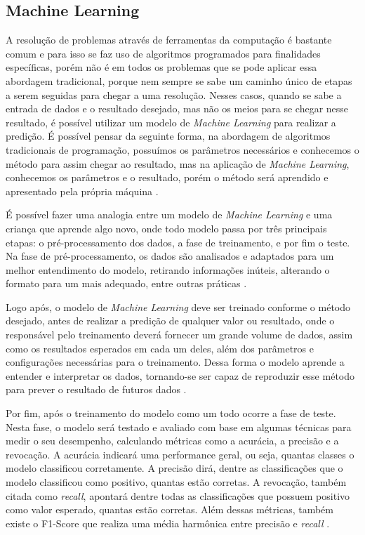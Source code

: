 \subsection{Machine Learning}

A resolução de problemas através de ferramentas da computação é bastante comum e para isso se faz uso de algoritmos programados para finalidades específicas, porém não é em todos os problemas que se pode aplicar essa abordagem tradicional, porque nem sempre se sabe um caminho único de etapas a serem seguidas para chegar a uma resolução. Nesses casos, quando se sabe a entrada de dados e o resultado desejado, mas não os meios para se chegar nesse resultado, é possível utilizar um modelo de \emph{Machine Learning} para realizar a predição. É possível pensar da seguinte forma, na abordagem de algoritmos tradicionais de programação, possuímos os parâmetros necessários e conhecemos o método para assim chegar ao resultado, mas na aplicação de \emph{Machine Learning}, conhecemos os parâmetros e o resultado, porém o método será aprendido e apresentado pela própria máquina \cite{machineLearning}.

É possível fazer uma analogia entre um modelo de \emph{Machine Learning} e uma criança que aprende algo novo, onde todo modelo passa por três principais etapas: o pré-processamento dos dados, a fase de treinamento, e por fim o teste. Na fase de pré-processamento, os dados são analisados e adaptados para um melhor entendimento do modelo, retirando informações inúteis, alterando o formato para um mais adequado, entre outras práticas \cite{machineLearningPython}.

Logo após, o modelo de \emph{Machine Learning} deve ser treinado conforme o método desejado, antes de realizar a predição de qualquer valor ou resultado, onde o responsável pelo treinamento deverá fornecer um grande volume de dados, assim como os resultados esperados em cada um deles, além dos parâmetros e configurações necessárias para o treinamento. Dessa forma o modelo aprende a entender e interpretar os dados, tornando-se ser capaz de reproduzir esse método para prever o resultado de futuros dados \cite{machineLearningPython}.

Por fim, após o treinamento do modelo como um todo ocorre a fase de teste. Nesta fase, o modelo será testado e avaliado com base em algumas técnicas para medir o seu desempenho, calculando métricas como a acurácia, a precisão e a revocação. A acurácia indicará uma performance geral, ou seja, quantas classes o modelo classificou corretamente. A precisão dirá, dentre as classificações que o modelo classificou como positivo, quantas estão corretas. A revocação, também citada como \emph{recall}, apontará dentre todas as classificações que possuem positivo como valor esperado, quantas estão corretas. Além dessas métricas, também existe o F1-Score que realiza uma média harmônica entre precisão e \emph{recall} \cite{machineLearningTensorFlow}.

